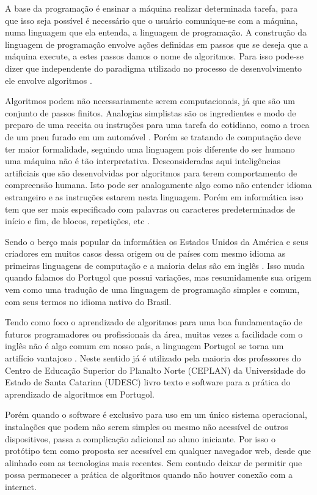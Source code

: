 A base da programação é ensinar a máquina realizar determinada tarefa, para que isso seja possível é necessário que o usuário comunique-se com a máquina, numa linguagem que ela entenda, a linguagem de programação. A construção da linguagem de programação envolve ações definidas em passos que se deseja que a máquina execute, a estes passos damos o nome de algoritmos. Para isso pode-se dizer que independente do paradigma utilizado no processo de desenvolvimento ele envolve algoritmos \cite{medeiros2015}.

Algoritmos podem não necessariamente serem computacionais, já que são um conjunto de passos finitos. Analogias simplistas são os ingredientes e modo de preparo de uma receita ou instruções para uma tarefa do cotidiano, como a troca de um pneu furado em um automóvel \cite{medina2006etal}. Porém se tratando de computação deve ter maior formalidade, seguindo uma linguagem pois diferente do ser humano uma máquina não é tão interpretativa. Desconsideradas aqui inteligências artificiais que são desenvolvidas por algoritmos para terem  comportamento de compreensão humana. Isto pode ser analogamente algo como não entender idioma estrangeiro e as instruções estarem nesta linguagem. Porém em informática isso tem que ser mais especificado com palavras ou caracteres predeterminados de início e fim, de blocos, repetições, etc \cite{dershem1990etal}.

Sendo o berço mais popular da informática os Estados Unidos da América e seus criadores em muitos casos dessa origem ou de países com mesmo idioma as primeiras linguagens de computação e a maioria delas são em inglês \cite{sebesta2009}. Isso muda quando falamos do Portugol que possui variações, mas resumidamente sua origem vem como uma tradução de uma linguagem de programação simples e comum, com seus termos no idioma nativo do Brasil.

Tendo como foco o aprendizado de algoritmos para uma boa fundamentação de futuros programadores ou profissionais da área, muitas vezes a facilidade com o inglês não é algo comum em nosso país, a linguagem Portugol se torna um artifício vantajoso \cite{jesus2004etal}.  Neste sentido já é utilizado pela maioria dos professores do Centro de Educação Superior do Planalto Norte (CEPLAN) da Universidade do Estado de Santa Catarina (UDESC) livro texto e software para a prática do aprendizado de algoritmos em Portugol.

Porém quando o software é exclusivo para uso em um único sistema operacional, instalações que podem não serem simples ou mesmo não acessível de outros dispositivos, passa a complicação adicional ao aluno iniciante. Por isso o protótipo tem como proposta ser acessível em qualquer navegador web, desde que alinhado com as tecnologias mais recentes. Sem contudo deixar de permitir que possa permanecer a prática de algoritmos quando não houver conexão com a internet.
